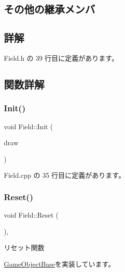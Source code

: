 \subsection*{その他の継承メンバ}


\subsection{詳解}


 Field.\+h の 39 行目に定義があります。



\subsection{関数詳解}
\mbox{\label{class_field_a8360ab68eaf346984eab8bce4c37c3b3}} 
\subsubsection{\texorpdfstring{Init()}{Init()}}
{\footnotesize\ttfamily void Field\+::\+Init (\begin{DoxyParamCaption}\item[{\mbox{\hyperlink{class_draw_base}{Draw\+Base}} $\ast$}]{draw }\end{DoxyParamCaption})}



 Field.\+cpp の 35 行目に定義があります。

\mbox{\label{class_field_a5b140074dcca821ac702da348238c6d4}} 
\subsubsection{\texorpdfstring{Reset()}{Reset()}}
{\footnotesize\ttfamily void Field\+::\+Reset (\begin{DoxyParamCaption}{ }\end{DoxyParamCaption})\hspace{0.3cm}{\ttfamily [override]}, {\ttfamily [virtual]}}



リセット関数 



\mbox{\hyperlink{class_game_object_base_a85c59554f734bcb09f1a1e18d9517dce}{Game\+Object\+Base}}を実装しています。



